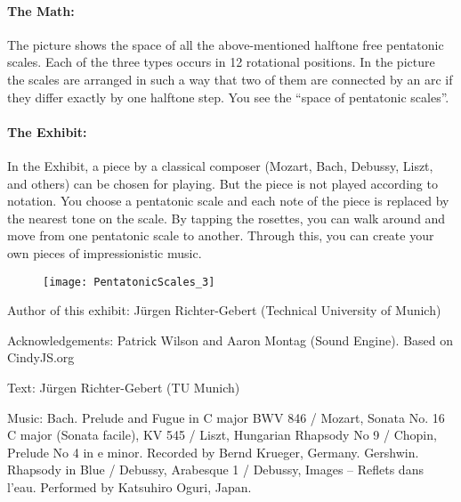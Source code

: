\paragraph{The Math:} The picture shows the space of all the above-mentioned halftone free pentatonic scales. Each of the three types occurs in 12 rotational positions. In the picture the scales are arranged in such a way that two of them are connected by an arc if they differ exactly by one halftone step. You see the ``space of pentatonic scales''.

\paragraph{The Exhibit:} In the Exhibit, a piece by a classical composer (Mozart, Bach, Debussy, Liszt, and others) can be chosen for playing. But the piece is not played according to notation. You choose a pentatonic scale and each note of the piece is replaced by the nearest tone on the scale. By tapping the rosettes, you can walk around and move from one pentatonic scale to another. Through this, you can create your own pieces of impressionistic music.

\begin{figure}
\centering
\texttt{[image: PentatonicScales\_3]}
\end{figure}

\begin{sectcredits}
\item[Author of this exhibit:] Jürgen Richter-Gebert (Technical University of Munich)
\item[Acknowledgements:] Patrick Wilson and Aaron Montag (Sound Engine). Based on CindyJS.org
\item[Text:] Jürgen Richter-Gebert (TU Munich)
\item[Music:] Bach. Prelude and Fugue in C major BWV 846 / Mozart, Sonata No. 16 C major (Sonata facile), KV 545 / Liszt, Hungarian Rhapsody No 9 / Chopin, Prelude No 4  in e minor. Recorded by Bernd Krueger, Germany.
Gershwin. Rhapsody in Blue / Debussy, Arabesque 1 / Debussy, Images -- Reflets dans l'eau. Performed by Katsuhiro Oguri, Japan.
\end{sectcredits}
